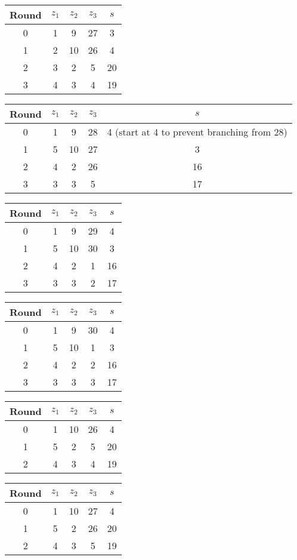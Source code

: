\begin{tabular}{c | c | c | c | c }
Round & $z_1$ & $z_2$ & $z_3$ & $s$ \\
\hline
0 & 1 & 9 & 27 & 3 \\
1 & 2 & 10 & 26 & 4 \\
2 & 3 & 2 & 5 & 20 \\
3 & 4 & 3 & 4 & 19
\end{tabular}

\begin{tabular}{c | c | c | c | c }
Round & $z_1$ & $z_2$ & $z_3$ & $s$ \\
\hline
0 & 1 & 9 & 28 & 4 (start at 4 to prevent branching from 28) \\
1 & 5 & 10 & 27 & 3 \\
2 & 4 & 2 & 26 & 16 \\
3 & 3 & 3 & 5 & 17
\end{tabular}

\begin{tabular}{c | c | c | c | c }
Round & $z_1$ & $z_2$ & $z_3$ & $s$ \\
\hline
0 & 1 & 9 & 29 & 4 \\
1 & 5 & 10 & 30 & 3 \\
2 & 4 & 2 & 1 & 16 \\
3 & 3 & 3 & 2 & 17
\end{tabular}

\begin{tabular}{c | c | c | c | c }
Round & $z_1$ & $z_2$ & $z_3$ & $s$ \\
\hline
0 & 1 & 9 & 30 & 4 \\
1 & 5 & 10 & 1 & 3 \\
2 & 4 & 2 & 2 & 16 \\
3 & 3 & 3 & 3 & 17
\end{tabular}

\begin{tabular}{c | c | c | c | c }
Round & $z_1$ & $z_2$ & $z_3$ & $s$ \\
\hline
0 & 1 & 10 & 26 & 4 \\
1 & 5 & 2 & 5 & 20 \\
2 & 4 & 3 & 4 & 19
\end{tabular}

\begin{tabular}{c | c | c | c | c }
Round & $z_1$ & $z_2$ & $z_3$ & $s$ \\
\hline
0 & 1 & 10 & 27 & 4 \\
1 & 5 & 2 & 26 & 20 \\
2 & 4 & 3 & 5 & 19
\end{tabular}

